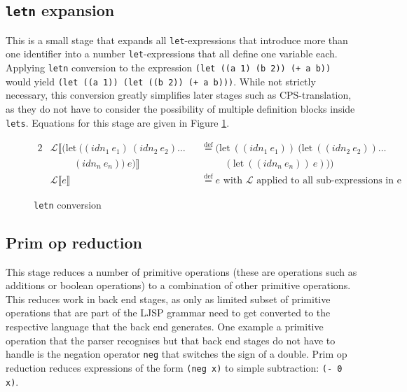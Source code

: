 \documentclass[11pt]{report}
\newcommand{\eqdef}{\stackrel{\text{def}}{=}}%
\begin{document}
\subsection{\texttt{letn} expansion}
This is a small stage that expands all \texttt{let}-expressions that introduce more than one identifier into a number \texttt{let}-expressions that all define one variable each. Applying \texttt{letn} conversion to the expression \texttt{(let ((a 1) (b 2)) (+ a b))} would yield \texttt{(let ((a 1)) (let ((b 2)) (+ a b)))}. While not strictly necessary, this conversion greatly simplifies later stages such as CPS-translation, as they do not have to consider the possibility of multiple definition blocks inside \texttt{lets}. Equations for this stage are given in Figure \ref{letnconversion}.

\begin{figure}[ht]
\begin{alignat*}{2}
&\mathcal{L}\llbracket (\text{let}\ ((idn_1\ e_1)\ (idn_2\ e_2)\dots &&\eqdef (\text{let}\ ((idn_1\ e_1))\ (\text{let}\ ((idn_2\ e_2)) \dots \\
&\hspace{1cm} (idn_n\ e_n))\ e)\rrbracket &&\hspace{1cm}(\text{let}\ ((idn_n\ e_n))\ e)))\\
&\mathcal{L}\llbracket e \rrbracket && \eqdef e\text{ with $\mathcal{L}$ applied to all sub-expressions in e}
\end{alignat*}
\caption{\texttt{letn} conversion}
\label{letnconversion}
\end{figure}

\subsection{Prim op reduction}

This stage reduces a number of primitive operations (these are operations such as additions or boolean operations) to a combination of other primitive operations. This reduces work in back end stages, as only as limited subset of primitive operations that are part of the LJSP grammar need to get converted to the respective language that the back end generates. One example a primitive operation that the parser recognises but that back end stages do not have to handle is the negation operator \texttt{neg} that switches the sign of a double. Prim op reduction reduces expressions of the form \texttt{(neg x)} to simple subtraction: \texttt{(- 0 x)}.
\end{document}
